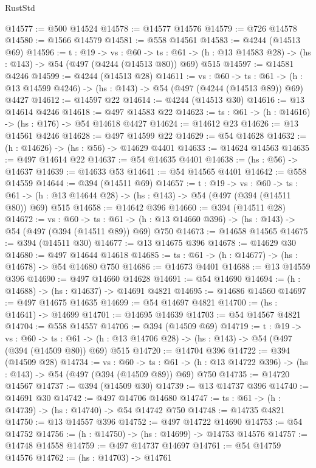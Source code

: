 \begin{lexlean}{RustStd}
\begin{coremodule}
@14577 := @500 @14524
@14578 := @14577 @14576
@14579 := @726 @14578
@14580 := @1566 @14579
@14581 := @558 @14561
@14583 := @4244 (@14513 @69)
@14596 := {t : @19} ->
  {vs : @60} ->
  {ts : @61} -> (h : @13 @14583 @28) -> (hs : @143) -> @54 (@497 (@4244 (@14513 @80)) @69) @515
@14597 := @14581 @4246
@14599 := @4244 (@14513 @28)
@14611 := {vs : @60} ->
  {ts : @61} -> (h : @13 @14599 @4246) -> (hs : @143) -> @54 (@497 (@4244 (@14513 @89)) @69) @4427
@14612 := @14597 @22
@14614 := @4244 (@14513 @30)
@14616 := @13 @14614 @4246
@14618 := @497 @14583 @22
@14623 := {ts : @61} -> (h : @14616) -> (hs : @176) -> @54 @14618 @4427
@14624 := @14612 @23
@14626 := @13 @14561 @4246
@14628 := @497 @14599 @22
@14629 := @54 @14628
@14632 := (h : @14626) -> (hs : @56) -> @14629 @4401
@14633 := @14624 @14563
@14635 := @497 @14614 @22
@14637 := @54 @14635 @4401
@14638 := (hs : @56) -> @14637
@14639 := @14633 @53
@14641 := @54 @14565 @4401
@14642 := @558 @14559
@14644 := @394 (@14511 @69)
@14657 := {t : @19} ->
  {vs : @60} ->
  {ts : @61} -> (h : @13 @14644 @28) -> (hs : @143) -> @54 (@497 (@394 (@14511 @80)) @69) @515
@14658 := @14642 @396
@14660 := @394 (@14511 @28)
@14672 := {vs : @60} ->
  {ts : @61} -> (h : @13 @14660 @396) -> (hs : @143) -> @54 (@497 (@394 (@14511 @89)) @69) @750
@14673 := @14658 @14565
@14675 := @394 (@14511 @30)
@14677 := @13 @14675 @396
@14678 := @14629 @30
@14680 := @497 @14644 @14618
@14685 := {ts : @61} -> (h : @14677) -> (hs : @14678) -> @54 @14680 @750
@14686 := @14673 @4401
@14688 := @13 @14559 @396
@14690 := @497 @14660 @14628
@14691 := @54 @14690
@14694 := (h : @14688) -> (hs : @14637) -> @14691 @4821
@14695 := @14686 @14560
@14697 := @497 @14675 @14635
@14699 := @54 @14697 @4821
@14700 := (hs : @14641) -> @14699
@14701 := @14695 @14639
@14703 := @54 @14567 @4821
@14704 := @558 @14557
@14706 := @394 (@14509 @69)
@14719 := {t : @19} ->
  {vs : @60} ->
  {ts : @61} -> (h : @13 @14706 @28) -> (hs : @143) -> @54 (@497 (@394 (@14509 @80)) @69) @515
@14720 := @14704 @396
@14722 := @394 (@14509 @28)
@14734 := {vs : @60} ->
  {ts : @61} -> (h : @13 @14722 @396) -> (hs : @143) -> @54 (@497 (@394 (@14509 @89)) @69) @750
@14735 := @14720 @14567
@14737 := @394 (@14509 @30)
@14739 := @13 @14737 @396
@14740 := @14691 @30
@14742 := @497 @14706 @14680
@14747 := {ts : @61} -> (h : @14739) -> (hs : @14740) -> @54 @14742 @750
@14748 := @14735 @4821
@14750 := @13 @14557 @396
@14752 := @497 @14722 @14690
@14753 := @54 @14752
@14756 := (h : @14750) -> (hs : @14699) -> @14753 @14576
@14757 := @14748 @14558
@14759 := @497 @14737 @14697
@14761 := @54 @14759 @14576
@14762 := (hs : @14703) -> @14761

\end{coremodule}
\end{lexlean}
